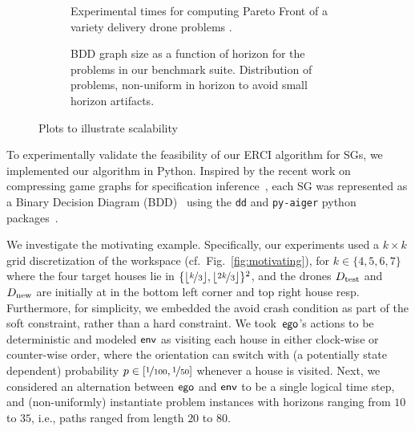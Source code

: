\begin{figure*}
    \begin{subfigure}{0.5\textwidth}
  \centering
  \scalebox{0.58}{
    
    }
    \caption{
      Experimental times for computing Pareto Front of a variety
      delivery drone problems
      \label{fig:exp_times}.
    }
  \end{subfigure}
  \hfill
    \begin{subfigure}{0.5\textwidth}
    \centering \scalebox{0.53}{
      
    }
    \caption{
      BDD graph size as a function of horizon for the problems in our
      benchmark suite. Distribution of problems, non-uniform in horizon
      to avoid small horizon artifacts\label{fig:bdd_sizes}.
    }
  \end{subfigure}
  \caption{Plots to illustrate scalability} 
\end{figure*}

To experimentally validate the feasibility of our ERCI algorithm for
SGs, we implemented our algorithm in Python.
Inspired by the recent work on compressing game graphs for specification
inference~\cite{DBLP:conf/cav/Vazquez-Chanlatte20}, each SG was represented
as a Binary Decision Diagram (BDD)~\cite{DBLP:journals/csur/Bryant92} using the
\texttt{dd} and \texttt{py-aiger} python packages~\cite{dd, pyAiger}. 

We investigate the motivating example.
Specifically, our experiments used
a $k\times k$ grid discretization of the workspace (cf.\ Fig.~\ref{fig:motivating}), for $k \in
\{4,5,6,7\}$ where the four target houses lie in
$\{\lfloor\nicefrac{k}{3}\rfloor, \lfloor\nicefrac{2k}{3}\rfloor
\}^2$, and the drones ${D_{\text{test}}}$ and ${D_{\text{new}}}$ are initially at in the bottom left corner and top right house resp. Furthermore, for simplicity, we embedded the avoid crash
condition as part of the soft constraint, rather than a hard
constraint\footnotemark. We took~$\mathsf{ego}$'s actions to be deterministic
and modeled $\mathsf{env}$ as visiting each house in either clock-wise or
counter-wise order, where the orientation can switch with
(a potentially state dependent) probability $p \in [\nicefrac{1}{100},
\nicefrac{1}{50}]$ whenever a house is visited. Next, we considered an
alternation between $\mathsf{ego}$ and $\mathsf{env}$ to be a single logical time
step, and (non-uniformly) instantiate problem instances with horizons
ranging from $10$ to $35$, i.e., paths ranged from length $20$ to
$80$.



